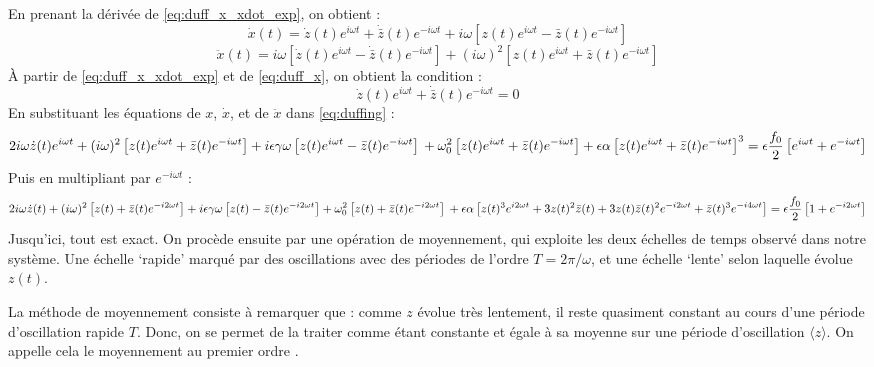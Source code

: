 En prenant la dérivée de \eqref{eq:duff_x_xdot_exp}, on obtient :
\begin{equation}
    \dot{x}(t) = \dot{z}(t)e^{i\omega t} + \dot{\bar{z}}(t) e^{-i\omega t} + i\omega \left[ z(t)e^{i\omega t} - \bar{z}(t) e^{-i\omega t} \right]
    \label{eq:duff_x}
\end{equation}
\begin{equation}
    \ddot{x}(t) = i\omega \left[ \dot{z}(t)e^{i\omega t} - \dot{\bar{z}}(t) e^{-i\omega t} \right] + (i\omega)^2 \left[ z(t)e^{i\omega t} + \bar{z}(t) e^{-i\omega t} \right]
\end{equation}
À partir de \eqref{eq:duff_x_xdot_exp} et de \eqref{eq:duff_x}, on obtient la condition :
\begin{equation}
    \dot{z}(t)e^{i\omega t} + \dot{\bar{z}}(t) e^{-i\omega t} = 0
\end{equation}
%
En substituant les équations de $x$, $\dot{x}$, et de $\ddot{x}$ dans \eqref{eq:duffing} :
%
\begin{dmath}
    2i\omega \dot{z}(t)e^{i\omega t} + (i\omega)^2 \left[ z(t)e^{i\omega t} + \bar{z}(t) e^{-i\omega t} \right]
    + i\epsilon\gamma\omega \left[ z(t)e^{i\omega t} - \bar{z}(t) e^{-i\omega t} \right] \\
    + \omega_0^2 \left[ z(t)e^{i\omega t} + \bar{z}(t) e^{-i\omega t} \right]
    + \epsilon \alpha \left[ z(t)e^{i\omega t} + \bar{z}(t) e^{-i\omega t} \right]^3 = \epsilon \frac{f_0}{2}\left[ e^{i\omega t} + e^{-i\omega t} \right]
\end{dmath}
Puis en multipliant par $e^{-i\omega t}$ :
\begin{dmath}
    2i\omega \dot{z}(t) + (i\omega)^2 \left[ z(t) + \bar{z}(t) e^{-i 2 \omega t} \right]
    + i\epsilon\gamma\omega \left[ z(t) - \bar{z}(t) e^{-i 2 \omega t} \right]
    + \omega_0^2 \left[ z(t) + \bar{z}(t) e^{-i 2 \omega t} \right] \\
    + \epsilon \alpha \left[ z(t)^3 e^{i 2 \omega t} + 3 z(t)^2 \bar{z}(t) + 3z(t)\bar{z}(t)^2 e^{-i2\omega t} + \bar{z}(t)^3 e^{-i4 \omega t} \right]
    = \epsilon \frac{f_0}{2}\left[ 1 + e^{-i 2 \omega t} \right]
    \label{eq:duff_pre_av}
\end{dmath}
%
%
Jusqu'ici, tout est exact. On procède ensuite par une opération de moyennement, qui exploite les deux échelles de temps observé dans notre système. 
Une échelle `rapide' marqué par des oscillations avec des périodes de l'ordre $T = 2\pi / \omega$, 
et une échelle `lente' selon laquelle évolue $z(t)$. 

La méthode de moyennement consiste à remarquer que : comme $z$ évolue très lentement, 
il reste quasiment constant au cours d'une période d'oscillation rapide $T$. 
Donc, on se permet de la traiter comme étant constante et égale à sa moyenne sur une période d'oscillation $\langle z \rangle$.
On appelle cela le moyennement au premier ordre \cite{rand_lecture_2012}.

